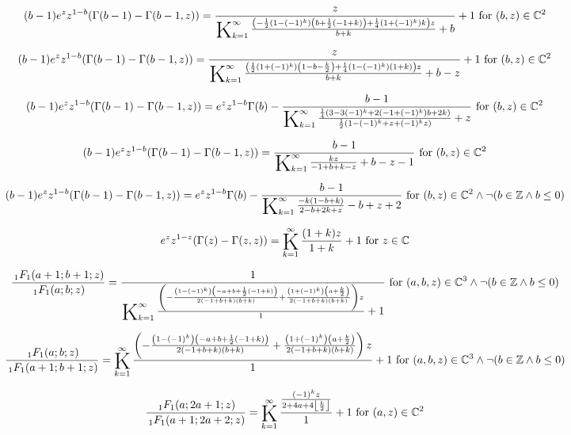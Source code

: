 \documentclass{article}
\newcommand{\bigK}{\mathop{\raisebox{-5pt}{\huge K}}}
\begin{document}
\[(b-1) e^z z^{1-b} (\Gamma (b-1)-\Gamma (b-1,z))=\frac{z}{\bigK_{k=1}^{\infty}\frac{\left(-\frac{1}{2} \left(1-(-1)^k\right) \left(b+\frac{1}{2} (-1+k)\right)+\frac{1}{4} \left(1+(-1)^k\right) k\right) z}{b+k}+b}+1\text{ for }(b,z)\in \mathbb{C}^2\] 

\[(b-1) e^z z^{1-b} (\Gamma (b-1)-\Gamma (b-1,z))=\frac{z}{\bigK_{k=1}^{\infty}\frac{\left(\frac{1}{2} \left(1+(-1)^k\right) \left(1-b-\frac{k}{2}\right)+\frac{1}{4} \left(1-(-1)^k\right) (1+k)\right) z}{b+k}+b-z}+1\text{ for }(b,z)\in \mathbb{C}^2\] 

\[(b-1) e^z z^{1-b} (\Gamma (b-1)-\Gamma (b-1,z))=e^z z^{1-b} \Gamma (b)-\frac{b-1}{\bigK_{k=1}^{\infty}\frac{\frac{1}{4} \left(3-3 (-1)^k+2 \left(-1+(-1)^k\right) b+2 k\right)}{\frac{1}{2} \left(1-(-1)^k+z+(-1)^k z\right)}+z}\text{ for }(b,z)\in \mathbb{C}^2\] 

\[(b-1) e^z z^{1-b} (\Gamma (b-1)-\Gamma (b-1,z))=\frac{b-1}{\bigK_{k=1}^{\infty}\frac{k z}{-1+b+k-z}+b-z-1}\text{ for }(b,z)\in \mathbb{C}^2\] 

\[(b-1) e^z z^{1-b} (\Gamma (b-1)-\Gamma (b-1,z))=e^z z^{1-b} \Gamma (b)-\frac{b-1}{\bigK_{k=1}^{\infty}\frac{-k (1-b+k)}{2-b+2 k+z}-b+z+2}\text{ for }(b,z)\in \mathbb{C}^2\land \neg (b\in \mathbb{Z}\land b\leq 0)\] 

\[e^z z^{1-z} (\Gamma (z)-\Gamma (z,z))=\bigK_{k=1}^{\infty}\frac{(1+k) z}{1+k}+1\text{ for }z\in \mathbb{C}\] 

\[\frac{\, _1F_1(a+1;b+1;z)}{\, _1F_1(a;b;z)}=\frac{1}{\bigK_{k=1}^{\infty}\frac{\left(-\frac{\left(1-(-1)^k\right) \left(-a+b+\frac{1}{2} (-1+k)\right)}{2 (-1+b+k) (b+k)}+\frac{\left(1+(-1)^k\right) \left(a+\frac{k}{2}\right)}{2 (-1+b+k) (b+k)}\right) z}{1}+1}\text{ for }(a,b,z)\in \mathbb{C}^3\land \neg (b\in \mathbb{Z}\land b\leq 0)\] 

\[\frac{\, _1F_1(a;b;z)}{\, _1F_1(a+1;b+1;z)}=\bigK_{k=1}^{\infty}\frac{\left(-\frac{\left(1-(-1)^k\right) \left(-a+b+\frac{1}{2} (-1+k)\right)}{2 (-1+b+k) (b+k)}+\frac{\left(1+(-1)^k\right) \left(a+\frac{k}{2}\right)}{2 (-1+b+k) (b+k)}\right) z}{1}+1\text{ for }(a,b,z)\in \mathbb{C}^3\land \neg (b\in \mathbb{Z}\land b\leq 0)\] 

\[\frac{\, _1F_1(a;2 a+1;z)}{\, _1F_1(a+1;2 a+2;z)}=\bigK_{k=1}^{\infty}\frac{\frac{(-1)^k z}{2+4 a+4 \left\lfloor \frac{k}{2}\right\rfloor }}{1}+1\text{ for }(a,z)\in \mathbb{C}^2\] 
\end{document}
